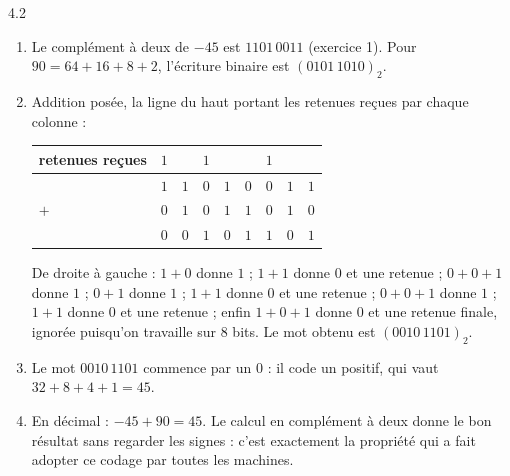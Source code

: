 \begin{corrige}{4.2}
\begin{enumerate}
\item Le complément à deux de $-45$ est $1101\,0011$ (exercice 1). Pour $90 = 64 + 16 + 8 + 2$, l'écriture binaire est $(0101\,1010)_2$.
\item Addition posée, la ligne du haut portant les retenues reçues par chaque colonne :
\begin{center}
\setlength{\tabcolsep}{4pt}
\begin{tabular}{L{2.2cm}C{0.5cm}C{0.5cm}C{0.5cm}C{0.5cm}C{0.5cm}C{0.5cm}C{0.5cm}C{0.5cm}}
\toprule
{}retenues reçues & $1$ & & $1$ & & & $1$ & & \\
\midrule
& $1$ & $1$ & $0$ & $1$ & $0$ & $0$ & $1$ & $1$ \\
$+$ & $0$ & $1$ & $0$ & $1$ & $1$ & $0$ & $1$ & $0$ \\
\midrule
& $0$ & $0$ & $1$ & $0$ & $1$ & $1$ & $0$ & $1$ \\
\bottomrule
\end{tabular}
\end{center}
De droite à gauche : $1+0$ donne $1$ ; $1+1$ donne $0$ et une retenue ; $0+0+1$ donne $1$ ; $0+1$ donne $1$ ; $1+1$ donne $0$ et une retenue ; $0+0+1$ donne $1$ ; $1+1$ donne $0$ et une retenue ; enfin $1+0+1$ donne $0$ et une retenue finale, ignorée puisqu'on travaille sur $8$ bits. Le mot obtenu est $(0010\,1101)_2$.
\item Le mot $0010\,1101$ commence par un $0$ : il code un positif, qui vaut $32 + 8 + 4 + 1 = 45$.
\item En décimal : $-45 + 90 = 45$. Le calcul en complément à deux donne le bon résultat sans regarder les signes : c'est exactement la propriété qui a fait adopter ce codage par toutes les machines.
\end{enumerate}
\end{corrige}

